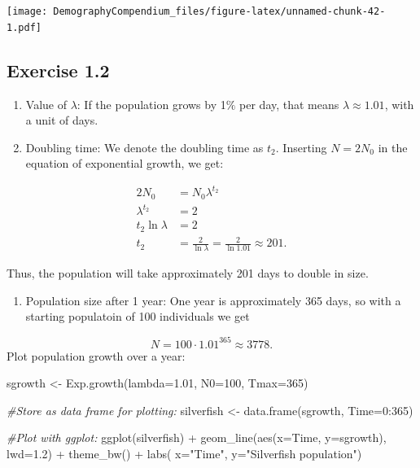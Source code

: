 \documentclass[
]{book}
\newenvironment{Shaded}{\begin{snugshade}}{\end{snugshade}}
\newcommand{\AttributeTok}[1]{\textcolor[rgb]{0.77,0.63,0.00}{#1}}
\newcommand{\CommentTok}[1]{\textcolor[rgb]{0.56,0.35,0.01}{\textit{#1}}}
\newcommand{\DecValTok}[1]{\textcolor[rgb]{0.00,0.00,0.81}{#1}}
\newcommand{\FloatTok}[1]{\textcolor[rgb]{0.00,0.00,0.81}{#1}}
\newcommand{\FunctionTok}[1]{\textcolor[rgb]{0.00,0.00,0.00}{#1}}
\newcommand{\NormalTok}[1]{#1}
\newcommand{\OtherTok}[1]{\textcolor[rgb]{0.56,0.35,0.01}{#1}}
\newcommand{\SpecialCharTok}[1]{\textcolor[rgb]{0.00,0.00,0.00}{#1}}
\newcommand{\StringTok}[1]{\textcolor[rgb]{0.31,0.60,0.02}{#1}}
\providecommand{\tightlist}{%
  \setlength{\itemsep}{0pt}\setlength{\parskip}{0pt}}
\begin{document}
\texttt{[image: DemographyCompendium\_files/figure-latex/unnamed-chunk-42-1.pdf]}

\hypertarget{exercise-1.2-1}{%
\subsection*{Exercise 1.2}\label{exercise-1.2-1}}

\begin{enumerate}
\def\labelenumi{\arabic{enumi}.}
\item
  Value of \(\lambda\): If the population grows by 1\(\%\) per day, that means \(\lambda\approx 1.01\), with a unit of days.
\item
  Doubling time: We denote the doubling time as \(t_2\). Inserting \(N=2N_0\) in the equation of exponential growth, we get:
\end{enumerate}

\begin{align*}
2N_0&=N_0\lambda^{t_2}\\ 
\lambda^{t_2}&=2 \\ t_2\ln\lambda&=2\\ 
t_2&=\frac{2}{\ln\lambda} =\frac{2}{\ln 1.01} \approx 201.  
\end{align*}

Thus, the population will take approximately 201 days to double in size.

\begin{enumerate}
\def\labelenumi{\arabic{enumi}.}
\setcounter{enumi}{2}
\tightlist
\item
  Population size after 1 year: One year is approximately 365 days, so with a starting populatoin of 100 individuals we get
\end{enumerate}

\[N=100\cdot 1.01^{365}\approx 3778.\]
Plot population growth over a year:

\begin{Shaded}
\begin{Highlighting}[]
\NormalTok{sgrowth }\OtherTok{\textless{}{-}} \FunctionTok{Exp.growth}\NormalTok{(}\AttributeTok{lambda=}\FloatTok{1.01}\NormalTok{, }\AttributeTok{N0=}\DecValTok{100}\NormalTok{, }\AttributeTok{Tmax=}\DecValTok{365}\NormalTok{)}

\CommentTok{\#Store as data frame for plotting:}
\NormalTok{silverfish }\OtherTok{\textless{}{-}} \FunctionTok{data.frame}\NormalTok{(sgrowth, }\AttributeTok{Time=}\DecValTok{0}\SpecialCharTok{:}\DecValTok{365}\NormalTok{)}

\CommentTok{\#Plot with ggplot:}
\FunctionTok{ggplot}\NormalTok{(silverfish) }\SpecialCharTok{+} 
    \FunctionTok{geom\_line}\NormalTok{(}\FunctionTok{aes}\NormalTok{(}\AttributeTok{x=}\NormalTok{Time, }\AttributeTok{y=}\NormalTok{sgrowth), }\AttributeTok{lwd=}\FloatTok{1.2}\NormalTok{) }\SpecialCharTok{+}
    \FunctionTok{theme\_bw}\NormalTok{() }\SpecialCharTok{+}
    \FunctionTok{labs}\NormalTok{( }\AttributeTok{x=}\StringTok{"Time"}\NormalTok{, }\AttributeTok{y=}\StringTok{"Silverfish population"}\NormalTok{)}
\end{Highlighting}
\end{Shaded}
\end{document}
